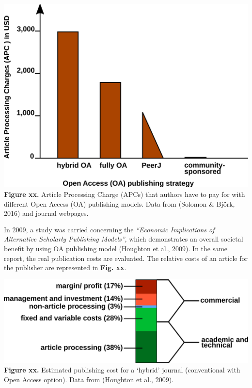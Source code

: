 \documentclass[10pt,fleqn]{wlpeerj}
\begin{document}
\includegraphics{fig-OA-strategies-APCs.png}
\textbf{Figure
xx.}
Article
Processing
Charge
(APCs)
that
authors
have
to
pay
for
with
different
Open
Access
(OA)
publishing
models.
Data
from
(Solomon
\&
Björk,
2016)
and
journal
webpages.

In
2009,
a
study
was
carried
concerning
the
\emph{``Economic
Implications
of
Alternative
Scholarly
Publishing
Models''},
which
demonstrates
an
overall
societal
benefit
by
using
OA
publishing
model
(Houghton
et
al.,
2009).
In
the
same
report,
the
real
publication
costs
are
evaluated.
The
relative
costs
of an
article
for
the
publisher
are
represented
in
\textbf{Fig.
xx}.

\includegraphics{fig-hybrid-publishing-costs.png}
\textbf{Figure
xx.}
Estimated
publishing
cost
for a
`hybrid'
journal
(conventional
with
Open
Access
option).
Data
from
(Houghton
et
al.,
2009).
\end{document}
